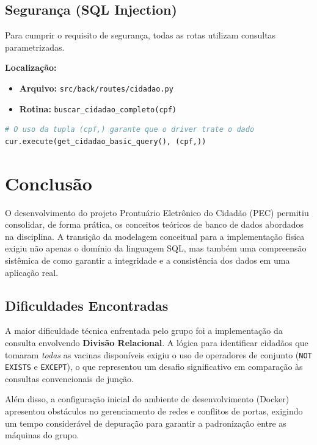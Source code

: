 \documentclass[12pt, a4paper]{article}
\begin{document}
\subsection{Segurança (SQL Injection)}
Para cumprir o requisito de segurança, todas as rotas utilizam consultas parametrizadas.

\noindent\textbf{Localização:}
\begin{itemize}
    \item \textbf{Arquivo:} \texttt{src/back/routes/cidadao.py}
    \item \textbf{Rotina:} \texttt{buscar\_cidadao\_completo(cpf)}
\end{itemize}

\begin{lstlisting}[language=Python, caption=Exemplo de Chamada Segura com Psycopg2]
# O uso da tupla (cpf,) garante que o driver trate o dado
cur.execute(get_cidadao_basic_query(), (cpf,))
\end{lstlisting}

\section{Conclusão}

O desenvolvimento do projeto Prontuário Eletrônico do Cidadão (PEC) permitiu consolidar, de forma prática, os conceitos teóricos de banco de dados abordados na disciplina. A transição da modelagem conceitual para a implementação física exigiu não apenas o domínio da linguagem SQL, mas também uma compreensão sistêmica de como garantir a integridade e a consistência dos dados em uma aplicação real.

\subsection{Dificuldades Encontradas}
A maior dificuldade técnica enfrentada pelo grupo foi a implementação da consulta envolvendo \textbf{Divisão Relacional}. A lógica para identificar cidadãos que tomaram \textit{todas} as vacinas disponíveis exigiu o uso de operadores de conjunto (\texttt{NOT EXISTS} e \texttt{EXCEPT}), o que representou um desafio significativo em comparação às consultas convencionais de junção.

Além disso, a configuração inicial do ambiente de desenvolvimento (Docker) apresentou obstáculos no gerenciamento de redes e conflitos de portas, exigindo um tempo considerável de depuração para garantir a padronização entre as máquinas do grupo.
\end{document}
